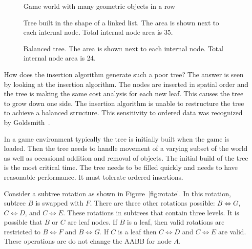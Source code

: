 \documentclass{article}
\begin{document}
\begin{figure}
	\begin{center}
		
	\end{center}
	\caption{Game world with many geometric objects in a row}
	\label{fig:tile_based}
\end{figure}

\begin{figure}
	\begin{center}
		
	\end{center}
	\caption{Tree built in the shape of a linked list. The area is shown next to each internal node. Total internal node area is 35. }
	\label{fig:linked_list}
\end{figure}

\begin{figure}
	\begin{center}
		
	\end{center}
	\caption{Balanced tree. The area is shown next to each internal node. Total internal node area is 24. }
	\label{fig:balanced}
\end{figure}

How does the insertion algorithm generate such a poor tree? The answer is seen by looking at the insertion algorithm. The nodes are inserted in spatial order and the tree is making the same cost analysis for each new leaf. This causes the tree to grow down one side. The insertion algorithm is unable to restructure the tree to achieve a balanced structure. This sensitivity to ordered data was recognized by Goldsmith~\cite{Goldsmith1987}.

In a game environment typically the tree is initially built when the game is loaded. Then the tree needs to handle movement of a varying subset of the world as well as occasional addition and removal of objects. The initial build of the tree is the most critical time. The tree needs to be filled quickly and needs to have reasonable performance. It must tolerate ordered insertions.

Consider a subtree rotation as shown in Figure~\ref{fig:rotate}. In this rotation, subtree $B$ is swapped with $F$. There are three other rotations possible: $B \Leftrightarrow G$, $C \Leftrightarrow D$, and $C \Leftrightarrow E$. These rotations in subtrees that contain three levels. It is possible that $B$ or $C$ are leaf nodes. If $B$ is a leaf, then valid rotations are restricted to $B \Leftrightarrow F$ and $B \Leftrightarrow G$. If $C$ is a leaf then $C \Leftrightarrow D$ and $C \Leftrightarrow E$ are valid. These operations are do not change the AABB for node $A$.
\end{document}
